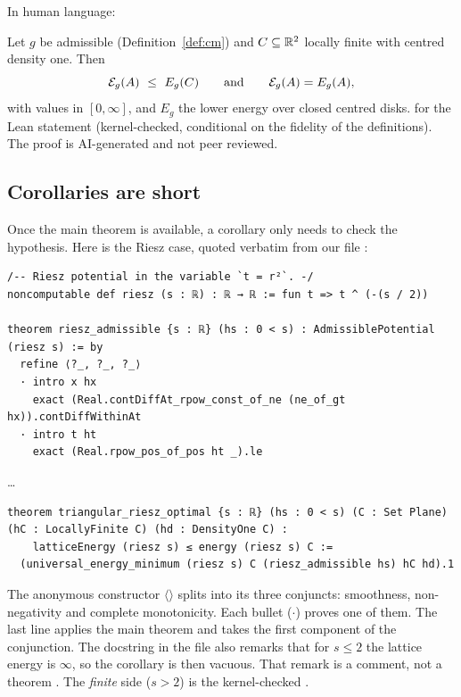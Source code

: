 In human language:

\begin{theorem}\label{thm:main-statement}
Let $g$ be admissible (Definition~\ref{def:cm}) and $C\subseteq\mathbb{R}^2$ locally finite with centred density one. Then
\[
  \mathcal E_g(\Lat)\ \le\ E_g(C)\qquad\text{and}\qquad \mathcal E_g(\Lat)=E_g(\Lat),
\]
with values in $[0,\infty]$, and $E_g$ the lower energy over closed centred disks. \tierA{} for the Lean statement
 (kernel-checked, conditional on the fidelity of the definitions).
The proof is AI-generated and not peer reviewed.
\end{theorem}

\subsection{Corollaries are short}

Once the main theorem is available, a corollary only needs to check the hypothesis. Here is the Riesz case, quoted
verbatim from our file :

\begin{leanbox}
\begin{lstlisting}[language=Lean]
/-- Riesz potential in the variable `t = r²`. -/
noncomputable def riesz (s : ℝ) : ℝ → ℝ := fun t => t ^ (-(s / 2))

theorem riesz_admissible {s : ℝ} (hs : 0 < s) : AdmissiblePotential (riesz s) := by
  refine ⟨?_, ?_, ?_⟩
  · intro x hx
    exact (Real.contDiffAt_rpow_const_of_ne (ne_of_gt hx)).contDiffWithinAt
  · intro t ht
    exact (Real.rpow_pos_of_pos ht _).le
\end{lstlisting}
\dots
\begin{lstlisting}[language=Lean]
theorem triangular_riesz_optimal {s : ℝ} (hs : 0 < s) (C : Set Plane) (hC : LocallyFinite C) (hd : DensityOne C) :
    latticeEnergy (riesz s) ≤ energy (riesz s) C :=
  (universal_energy_minimum (riesz s) C (riesz_admissible hs) hC hd).1
\end{lstlisting}
\end{leanbox}

The anonymous constructor $\langle$$\rangle$ splits  into its three
conjuncts: smoothness, non-negativity and complete monotonicity. Each bullet ($\cdot$) proves one of them. The last line applies
the main theorem and takes the first component  of the conjunction. The docstring in the file also remarks that
for $s\le2$ the lattice energy is $\infty$, so the corollary is then vacuous. That remark is a comment, not a theorem
\tierC{}. The \emph{finite} side ($s>2$) is the kernel-checked  \tierA{}.

